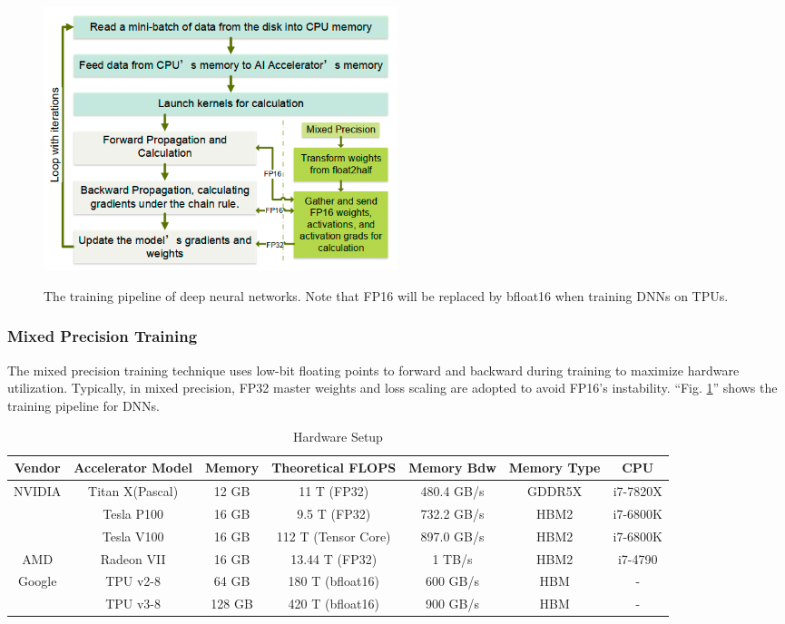 \begin{figure}[htbp!]
    \centering
    {    \includegraphics[width=0.5\textwidth]{images/training_pipeline}}
    \caption{The training pipeline of deep neural networks. Note that FP16 will be replaced by bfloat16 when training DNNs on TPUs.}
    \label{fig:pipeline}
\end{figure}

\subsubsection{Mixed Precision Training}
The mixed precision training technique uses low-bit floating points to forward and backward during training
to maximize hardware utilization.
Typically, in mixed precision, FP32 master weights and loss scaling are adopted to avoid FP16's instability.
``Fig. \ref{fig:pipeline}'' shows the training pipeline for DNNs.

\begin{table}[!htbp]
    \centering
    \caption{Hardware Setup}
    \label{tab:hardware}
    \begin{tabular}{c c c c c c c}
        \toprule
        Vendor & Accelerator Model & Memory & Theoretical FLOPS   & Memory Bdw & Memory Type & CPU      \\
        \midrule
        NVIDIA & Titan X(Pascal)   & 12 GB  & 11 T (FP32)         & 480.4 GB/s & GDDR5X      & i7-7820X \\
        & Tesla P100        & 16 GB  & 9.5 T (FP32)        & 732.2 GB/s & HBM2        & i7-6800K \\
        & Tesla V100        & 16 GB  & 112 T (Tensor Core) & 897.0 GB/s & HBM2        & i7-6800K \\
        AMD    & Radeon VII        & 16 GB  & 13.44 T (FP32)      & 1 TB/s     & HBM2        & i7-4790  \\
        Google & TPU v2-8          & 64 GB  & 180 T (bfloat16)    & 600 GB/s   & HBM         & -        \\
        & TPU v3-8          & 128 GB & 420 T (bfloat16)    & 900 GB/s   & HBM         & -        \\
        \bottomrule
    \end{tabular}
\end{table}

